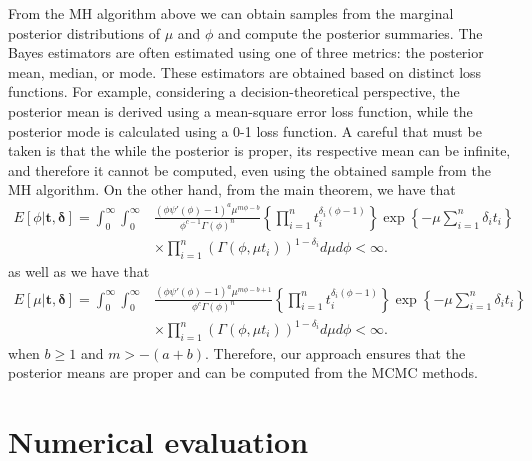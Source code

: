 \documentclass[12pt]{article} %
\theoremstyle{plain}%
\theoremstyle{definition}
\theoremstyle{remark}
\begin{document}
From the MH algorithm above we can obtain samples from the marginal posterior distributions of $\mu$ and $\phi$ and compute the posterior summaries. The Bayes estimators are often estimated using one of three metrics: the posterior mean, median, or mode. These estimators are obtained based on distinct loss functions. For example, considering a decision-theoretical perspective, the posterior mean is derived using a mean-square error loss function, while the posterior mode is calculated using a 0-1 loss function. A careful that must be taken is that the while the posterior is proper, its respective mean can be infinite, and therefore it cannot be computed, even using the obtained sample from the MH algorithm. On the other hand, from the main theorem, we have that
\begin{equation*}
\begin{aligned}
E[\phi|\boldsymbol{t,\delta}]=\int_0^{\infty}\int_0^{\infty}&\frac{(\phi\psi'(\phi)-1)^{a}\mu^{m\phi-b}}{\phi^{c-1}\Gamma(\phi)^n}\left\{\prod_{i=1}^n{t_i^{\delta_i(\phi-1)}}\right\}\exp\left\{-\mu\sum_{i=1}^n {\delta_i}t_i\right\}\\&\times\prod_{i=1}^n\left(\Gamma(\phi,\mu t_i)\right)^{1-\delta_i} d\mu d\phi<\infty.
\end{aligned}
\end{equation*}
as well as we have that
\begin{equation*}
\begin{aligned}
E[\mu|\boldsymbol{t,\delta}]=\int_0^{\infty}\int_0^{\infty}&\frac{(\phi\psi'(\phi)-1)^{a}\mu^{m\phi-b+1}}{\phi^{c}\Gamma(\phi)^n}\left\{\prod_{i=1}^n{t_i^{\delta_i(\phi-1)}}\right\}\exp\left\{-\mu\sum_{i=1}^n {\delta_i}t_i\right\}\\&\times\prod_{i=1}^n\left(\Gamma(\phi,\mu t_i)\right)^{1-\delta_i} d\mu d\phi<\infty.
\end{aligned}
\end{equation*}
when $b\geq 1$ and $m>-(a+b)$. Therefore, our approach ensures that the posterior means are proper and can be computed from the MCMC methods.



\section{Numerical evaluation}\label{sec:4}
\end{document}
